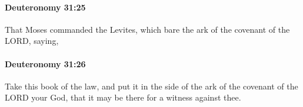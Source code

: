 		\paragraph{Deuteronomy 31:25} %
			\label{DEUTERONOMY-31-25}

			That Moses commanded the Levites, which bare the ark of the covenant of the LORD, saying,


		\paragraph{Deuteronomy 31:26} %
			\label{DEUTERONOMY-31-26}

			Take this book of the law, and put it in the side of the ark of the covenant of the LORD your God, that it may be there for a witness against thee.


